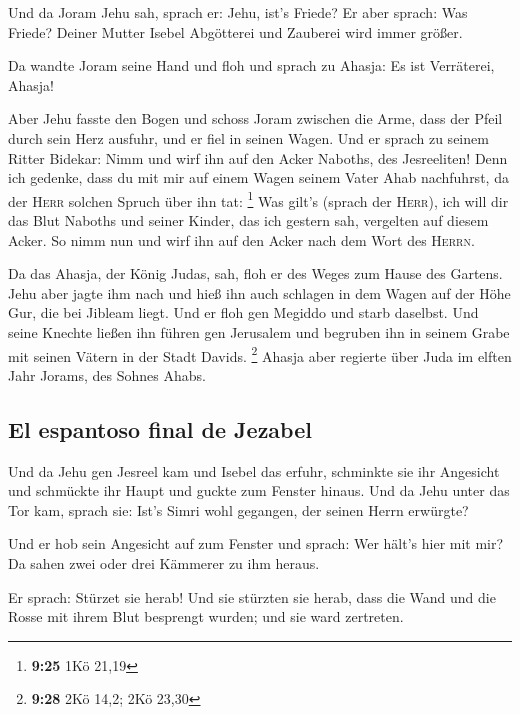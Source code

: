  Und da Joram Jehu sah, sprach er: Jehu, ist's Friede? Er
aber sprach: Was Friede? Deiner Mutter Isebel Abgötterei und Zauberei
wird immer größer.

 Da wandte Joram seine Hand und floh und sprach zu
Ahasja: Es ist Verräterei, Ahasja!

 Aber Jehu fasste den Bogen und schoss Joram zwischen die
Arme, dass der Pfeil durch sein Herz ausfuhr, und er fiel in seinen
Wagen.  Und er sprach zu seinem Ritter Bidekar: Nimm und
wirf ihn auf den Acker Naboths, des Jesreeliten! Denn ich gedenke, dass
du mit mir auf einem Wagen seinem Vater Ahab nachfuhrst, da der
\textsc{Herr} solchen Spruch über ihn tat: \footnote{\textbf{9:25} 1Kö
  21,19}  Was gilt's (sprach der \textsc{Herr}), ich will
dir das Blut Naboths und seiner Kinder, das ich gestern sah, vergelten
auf diesem Acker. So nimm nun und wirf ihn auf den Acker nach dem Wort
des \textsc{Herrn}.

 Da das Ahasja, der König Judas, sah, floh er des Weges
zum Hause des Gartens. Jehu aber jagte ihm nach und hieß ihn auch
schlagen in dem Wagen auf der Höhe Gur, die bei Jibleam liegt. Und er
floh gen Megiddo und starb daselbst.  Und seine Knechte
ließen ihn führen gen Jerusalem und begruben ihn in seinem Grabe mit
seinen Vätern in der Stadt Davids. \footnote{\textbf{9:28} 2Kö 14,2; 2Kö
  23,30}  Ahasja aber regierte über Juda im elften Jahr
Jorams, des Sohnes Ahabs.

\hypertarget{el-espantoso-final-de-jezabel}{%
\subsection{El espantoso final de
Jezabel}\label{el-espantoso-final-de-jezabel}}

 Und da Jehu gen Jesreel kam und Isebel das erfuhr,
schminkte sie ihr Angesicht und schmückte ihr Haupt und guckte zum
Fenster hinaus.  Und da Jehu unter das Tor kam, sprach
sie: Ist's Simri wohl gegangen, der seinen Herrn erwürgte?

 Und er hob sein Angesicht auf zum Fenster und sprach:
Wer hält's hier mit mir? Da sahen zwei oder drei Kämmerer zu ihm heraus.

 Er sprach: Stürzet sie herab! Und sie stürzten sie
herab, dass die Wand und die Rosse mit ihrem Blut besprengt wurden; und
sie ward zertreten.

